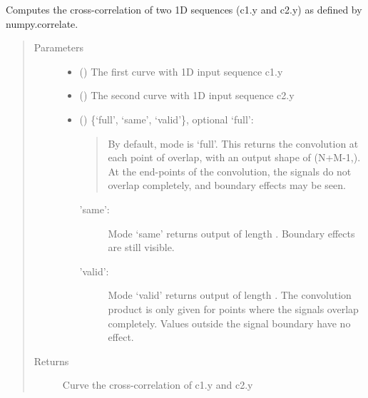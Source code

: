 \documentclass[letterpaper,10pt,english]{sphinxmanual}
\begin{document}
\begin{fulllineitems}
\label{\detokenize{pydv:pydvpy.correlate}}
Computes the cross-correlation of two 1D sequences (c1.y and c2.y) as defined by numpy.correlate.
\begin{quote}\begin{description}
\item[{Parameters}] \leavevmode\begin{itemize}
\item {} 
 ({\hyperref[\detokenize{pydv:curve.Curve}]{}}) \textendash{} The first curve with 1D input sequence c1.y

\item {} 
 ({\hyperref[\detokenize{pydv:curve.Curve}]{}}) \textendash{} The second curve with 1D input sequence c2.y

\item {} 
 () \textendash{} 
\{‘full’, ‘same’, ‘valid’\}, optional
‘full’:
\begin{quote}

By default, mode is ‘full’.  This returns the convolution
at each point of overlap, with an output shape of (N+M-1,). At
the end-points of the convolution, the signals do not overlap
completely, and boundary effects may be seen.
\end{quote}
\begin{description}
\item[{’same’:}] \leavevmode
Mode ‘same’ returns output of length .  Boundary
effects are still visible.

\item[{’valid’:}] \leavevmode
Mode ‘valid’ returns output of length
.  The convolution product is only given
for points where the signals overlap completely.  Values outside
the signal boundary have no effect.

\end{description}


\end{itemize}

\item[{Returns}] \leavevmode
Curve \textendash{} the cross-correlation of c1.y and c2.y

\end{description}\end{quote}

\end{fulllineitems}
\end{document}
